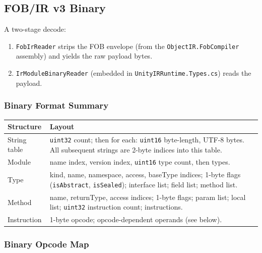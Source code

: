 \documentclass[11pt,a4paper]{article}
\newcommand{\code}[1]{\texttt{\small #1}}
\newcommand{\typename}[1]{\textcolor{typecolor}{\texttt{\small #1}}}
\begin{document}
\subsection{FOB/IR v3 Binary}

A two-stage decode:

\begin{enumerate}[leftmargin=2em]
  \item \typename{FobIrReader} strips the FOB envelope (from the \code{ObjectIR.FobCompiler}
        assembly) and yields the raw payload bytes.
  \item \typename{IrModuleBinaryReader} (embedded in \texttt{UnityIRRuntime.Types.cs})
        reads the payload.
\end{enumerate}

\subsubsection{Binary Format Summary}

\begin{longtable}{lp{9cm}}
  \toprule
  \textbf{Structure} & \textbf{Layout} \\
  \midrule
  \endhead
  String table       & \code{uint32} count; then for each: \code{uint16} byte-length,
                       UTF-8 bytes. All subsequent strings are 2-byte indices into
                       this table. \\
  Module             & name index, version index, \code{uint16} type count, then types. \\
  Type               & kind, name, namespace, access, baseType indices; 1-byte flags
                       (\code{isAbstract}, \code{isSealed}); interface list;
                       field list; method list. \\
  Method             & name, returnType, access indices; 1-byte flags; param list;
                       local list; \code{uint32} instruction count; instructions. \\
  Instruction        & 1-byte opcode; opcode-dependent operands (see below). \\
  \bottomrule
\end{longtable}

\subsubsection{Binary Opcode Map}
\end{document}
